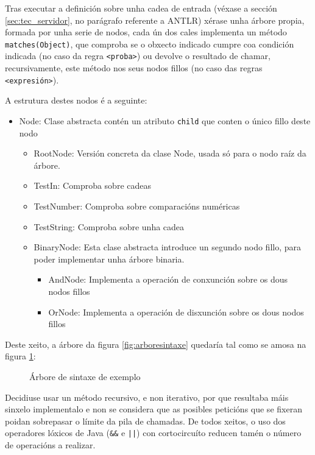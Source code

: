 Tras executar a definición sobre unha cadea de entrada (véxase a sección \ref{sec:tec_servidor}, no parágrafo referente a ANTLR) xérase unha árbore propia, formada por unha serie de nodos, cada ún dos cales implementa un método \texttt{matches(Object)}, que comproba se o obxecto indicado cumpre coa condición indicada (no caso da regra \texttt{<proba>}) ou devolve o resultado de chamar, recursivamente, este método nos seus nodos fillos (no caso das regras \texttt{<expresión>}).

A estrutura destes nodos é a seguinte:

\begin{itemize}
	\item Node: Clase abstracta contén un atributo \texttt{child} que conten o único fillo deste nodo
	
	\begin{itemize}
		\item RootNode: Versión concreta da clase Node, usada só para o nodo raíz da árbore.
		\item TestIn: Comproba sobre cadeas
		\item TestNumber: Comproba sobre comparacións numéricas
		\item TestString: Comproba sobre unha cadea
		\item BinaryNode: Esta clase abstracta introduce un segundo nodo fillo, para poder implementar unha árbore binaria.
		
		\begin{itemize}
			\item AndNode: Implementa a operación de conxunción sobre os dous nodos fillos
			\item OrNode: Implementa a operación de disxunción sobre os dous nodos fillos
		\end{itemize}
	\end{itemize}
\end{itemize}

\newpage

Deste xeito, a árbore da figura \ref{fig:arboresintaxe} quedaría tal como se amosa na figura \ref{fig:arborenodos}:

\begin{figure}[H]
	\centering
	\resizebox{.8\linewidth}{!}{}
	\caption{Árbore de sintaxe de exemplo}
	\label{fig:arborenodos}
\end{figure}

Decidiuse usar un método recursivo, e non iterativo, por que resultaba máis sinxelo implementalo e non se considera que as posibles peticións que se fixeran poidan sobrepasar o límite da pila de chamadas. De todos xeitos, o uso dos operadores lóxicos de Java (\texttt{\&\&} e \texttt{||}) con cortocircuíto reducen tamén o número de operacións a realizar.

